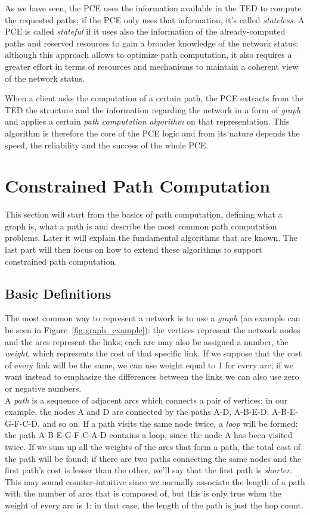 \documentclass[10pt,a4paper]{report}
\begin{document}
As we have seen, the PCE uses the information available in the TED to
compute the requested paths; if the PCE only uses that information,
it's called \textit{stateless}. A PCE is called
\textit{stateful} if it uses also the information of the
already-computed paths and reserved resources to gain a broader
knowledge of the network status; although this approach allows to
optimize path computation, it also requires a greater effort in terms
of resources and mechanisms to maintain a coherent view of the network
status.

When a client asks the computation of a certain path, the PCE extracts
from the TED the structure and the information regarding the network
in a form of \textit{graph} and applies a certain \textit{path
  computation algorithm} on that representation. This algorithm is
therefore the core of the PCE logic and from its nature depends the
speed, the reliability and the success of the whole PCE.

\section{Constrained Path Computation}

This section will start from the basics of path computation, defining
what a graph is, what a path is and describe the most common path
computation problems. Later it will explain the fundamental algorithms
that are known. The last part will then focus on how to extend these
algorithms to support constrained path computation.

\subsection{Basic Definitions}

The most common way to represent a network is to use a \textit{graph}
(an example can be seen in Figure~\ref{fig:graph_example}): the
vertices represent the network nodes and the arcs represent the links;
each arc may also be assigned a number, the \textit{weight}, which
represents the cost of that specific link. If we suppose that the cost
of every link will be the same, we can use weight equal to 1 for every
arc; if we want instead to emphasize the differences between the links
we can also use zero or negative numbers. \\
A \textit{path} is a sequence of adjacent arcs which connects a pair
of vertices: in our example, the nodes A and D are connected by the
paths A-D, A-B-E-D, A-B-E-G-F-C-D, and so on. If a path visits the
same node twice, a \textit{loop} will be formed: the path
A-B-E-G-F-C-A-D contains a loop, since the node A has been visited
twice. If we sum up all the weights of the arcs that form a path, the
total cost of the path will be found; if there are two paths
connecting the same nodes and the first path's cost is lesser than the
other, we'll say that the first path is \textit{shorter}. This may
sound counter-intuitive since we normally associate the length of a
path with the number of arcs that is composed of, but this is only true
when the weight of every arc is 1: in that case, the length of the
path is just the hop count.
\end{document}

